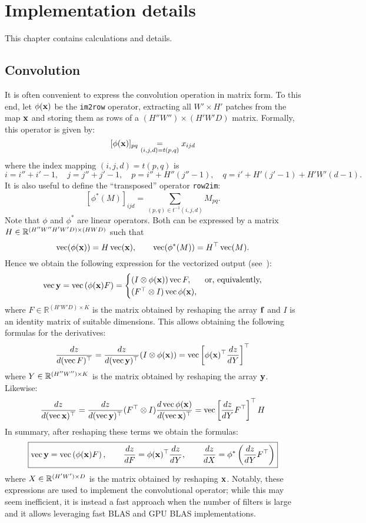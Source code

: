 \chapter{Implementation details}\label{s:impl}

This chapter contains calculations and details.

\section{Convolution}\label{s:impl-convolution}

It is often convenient to express the convolution operation in matrix form. To this end, let $\phi(\mathbf{x})$ be the \verb!im2row! operator, extracting all $W' \times H'$ patches from the map $\mathbf{x}$ and storing them as rows of a $(H''W'') \times (H'W'D)$ matrix. Formally, this operator is given by:
\[
   [\phi(\mathbf{x})]_{pq} \underset{(i,j,d)=t(p,q)}{=} x_{ijd}
\]
where the index mapping $(i,j,d) = t(p,q)$ is
\[
 i = i''+i'-1, \quad
 j = j''+j'-1, \quad
 p = i'' + H'' (j''-1), \quad
 q = i' + H'(j'-1) + H'W' (d-1).
\]
It is also useful to define the ``transposed'' operator \verb!row2im!:
\[
   [\phi^*(M)]_{ijd}
   =
   \sum_{(p,q) \in t^{-1}(i,j,d)}
   M_{pq}.
\]
Note that $\phi$ and $\phi^*$ are linear operators. Both can be expressed by a matrix $H\in\mathbb{R}^{(H''W''H'W'D) \times(HWD)}$ such that
\[
  \operatorname{vec}(\phi(\mathbf{x})) = H \operatorname{vec}(\mathbf{x}), \qquad 
  \operatorname{vec}(\phi^*(M)) = H^\top \operatorname{vec}(M).
\]
Hence we obtain the following expression for the vectorized output (see~\cite{kinghorn96integrals}):
\[
 \operatorname{vec}\mathbf{y} = 
 \operatorname{vec}\left(\phi(\mathbf{x}) F\right)
 =
 \begin{cases}
 (I \otimes \phi(\mathbf{x})) \operatorname{vec} F, & \text{or, equivalently,} \\
 (F^\top \otimes I) \operatorname{vec} \phi(\mathbf{x}),
 \end{cases}
\]
where $F\in\mathbb{R}^{(H'W'D)\times K}$ is the matrix obtained by reshaping the array $\mathbf{f}$ and $I$ is an identity matrix of suitable dimensions. This allows obtaining the following formulas for the derivatives:
\[
\frac{dz}{d(\operatorname{vec} F)^\top}
=
\frac{dz}{d(\operatorname{vec}\mathbf{y})^\top}
(I \otimes \phi(\mathbf{x}))
= \operatorname{vec}\left[ 
\phi(\mathbf{x})^\top 
\frac{dz}{dY}
\right]^\top
\]
where $Y\in\mathbb{R}^{(H''W'')\times K}$ is the matrix obtained by reshaping the array $\mathbf{y}$. Likewise:
\[
\frac{dz}{d(\operatorname{vec} \mathbf{x})^\top}
=
\frac{dz}{d(\operatorname{vec}\mathbf{y})^\top}
(F^\top \otimes I)
\frac{d\operatorname{vec} \phi(\mathbf{x})}{d(\operatorname{vec} \mathbf{x})^\top}
=
\operatorname{vec}\left[ 
\frac{dz}{dY}
F^\top
\right]^\top
H
\]
In summary, after reshaping these terms we obtain the formulas:
\[
\boxed{
\operatorname{vec}\mathbf{y} = 
 \operatorname{vec}\left(\phi(\mathbf{x}) F\right),
\qquad
\frac{dz}{dF}
=
\phi(\mathbf{x})^\top\frac{d z}{d Y},
\qquad
\frac{d z}{d X}
=
\phi^*\left(
\frac{d z}{d Y}F^\top
\right)
}
\]
where $X\in\mathbb{R}^{(H'W')\times D}$ is the matrix obtained by reshaping $\mathbf{x}$. Notably, these expressions are used to implement the convolutional operator; while this may seem inefficient, it is instead a fast approach when the number of filters is large and it allows leveraging fast BLAS and GPU BLAS implementations.

